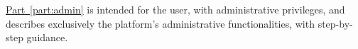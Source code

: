 	\hyperref[part:admin]{Part~\ref*{part:admin}} is intended for the \admin user, with administrative privileges, and describes exclusively the platform’s administrative functionalities, with step-by-step guidance.
	 
	\newpage
	
    \setlength{\parskip}{0.3em}
    \tableofcontents
    \setlength{\parskip}{0.8em}
    
    \thispagestyle{empty} 	%
    \clearpage              %
    \setcounter{page}{1}    %
    \pagestyle{plain}       %
    
    \newpage
    
    
    
    
   

